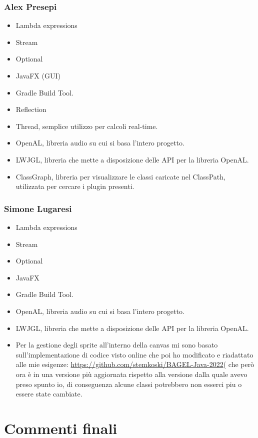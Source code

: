 \documentclass[a4paper,12pt]{report}
\begin{document}
\subsection*{Alex Presepi}
\begin{itemize}
	\item Lambda expressions
	\item Stream
	\item Optional
	\item JavaFX (GUI)
	\item Gradle Build Tool.
	\item Reflection
	\item Thread, semplice utilizzo per calcoli real-time.
	\item OpenAL,  libreria audio su cui si basa l’intero progetto.
	\item LWJGL, libreria che mette a disposizione delle API per la libreria OpenAL.
	\item ClassGraph, libreria per visualizzare le classi caricate nel ClassPath, utilizzata per cercare i plugin presenti.
\end{itemize}
\subsection*{Simone Lugaresi}
\begin{itemize}
	\item Lambda expressions
	\item Stream
	\item Optional
	\item JavaFX
	\item Gradle Build Tool.
	\item OpenAL, libreria audio su cui si basa l’intero progetto.
	\item LWJGL, libreria che mette a disposizione delle API per la libreria OpenAL.
	\item Per la gestione degli sprite all'interno della canvas mi sono basato sull'implementazione di codice visto online che poi ho modificato e riadattato alle mie esigenze: \url{https://github.com/stemkoski/BAGEL-Java-2022}( che però ora è in una versione più aggiornata rispetto alla versione dalla quale avevo preso spunto io, di conseguenza alcune classi potrebbero non esserci piu o essere state cambiate.
\end{itemize}

\chapter{Commenti finali}
\end{document}
